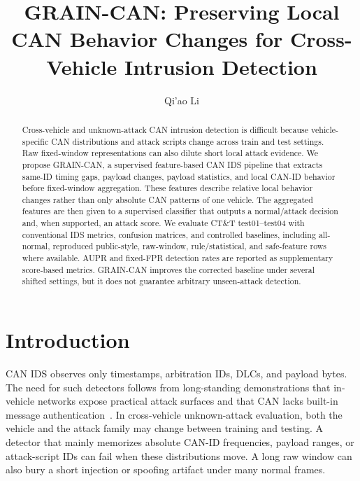 \documentclass[runningheads]{llncs}
\newcommand{\method}{GRAIN-CAN}
\begin{document}
\title{GRAIN-CAN: Preserving Local CAN Behavior Changes for Cross-Vehicle Intrusion Detection}
\author{Qi'ao Li}
\maketitle
\begin{abstract}
Cross-vehicle and unknown-attack CAN intrusion detection is difficult because vehicle-specific CAN distributions and attack scripts change across train and test settings.  Raw fixed-window representations can also dilute short local attack evidence.  We propose \method{}, a supervised feature-based CAN IDS pipeline that extracts same-ID timing gaps, payload changes, payload statistics, and local CAN-ID behavior before fixed-window aggregation.  These features describe relative local behavior changes rather than only absolute CAN patterns of one vehicle.  The aggregated features are then given to a supervised classifier that outputs a normal/attack decision and, when supported, an attack score.  We evaluate CT\&T test01--test04 with conventional IDS metrics, confusion matrices, and controlled baselines, including all-normal, reproduced public-style, raw-window, rule/statistical, and safe-feature rows where available.  AUPR and fixed-FPR detection rates are reported as supplementary score-based metrics.  GRAIN-CAN improves the corrected baseline under several shifted settings, but it does not guarantee arbitrary unseen-attack detection.
\end{abstract}

\section{Introduction}
CAN IDS observes only timestamps, arbitration IDs, DLCs, and payload bytes.  The need for such detectors follows from long-standing demonstrations that in-vehicle networks expose practical attack surfaces and that CAN lacks built-in message authentication~\cite{koscher2010experimental,checkoway2011comprehensive,miller2015remote}.  In cross-vehicle unknown-attack evaluation, both the vehicle and the attack family may change between training and testing.  A detector that mainly memorizes absolute CAN-ID frequencies, payload ranges, or attack-script IDs can fail when these distributions move.  A long raw window can also bury a short injection or spoofing artifact under many normal frames.
\end{document}

